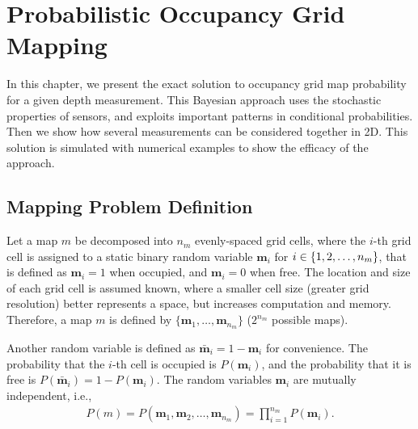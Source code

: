 
\chapter{Probabilistic Occupancy Grid Mapping} \label{chap:pogm}

In this chapter, we present the exact solution to occupancy grid map probability for a given depth measurement. This Bayesian approach uses the stochastic properties of sensors, and exploits important patterns in conditional probabilities. Then we show how several measurements can be considered together in 2D. This solution is simulated with numerical examples to show the efficacy of the approach.

\section{Mapping Problem Definition}

Let a map $m$ be decomposed into $n_m$ evenly-spaced grid cells, where the $i$-th grid cell is assigned to a static binary random variable $\mathbf{m}_i$ for $i\in\left\{ 1,2,\ldots,n_m \right\}$, that is defined as $\mathbf{m}_i=1$ when occupied, and $\mathbf{m}_i=0$ when free. The location and size of each grid cell is assumed known, where a smaller cell size (greater grid resolution) better represents a space, but increases computation and memory. Therefore, a map $m$ is defined by $\{\mathbf{m}_1,\ldots, \mathbf{m}_{n_m}\}$ ($2^{n_{m}}$ possible maps).

Another random variable is defined as $\bar{\mathbf{m}}_i=1-\mathbf{m}_i$ for convenience. The probability that the $i$-th cell is occupied is $P(\mathbf{m}_i)$, and the probability that it is free is $P(\bar{\mathbf{m}}_i)=1-P(\mathbf{m}_i)$. The random variables $\mathbf{m}_i$ are mutually independent, i.e.,
\begin{align}
P(m)=P(\mathbf{m}_1,\mathbf{m}_2,\ldots,\mathbf{m}_{n_m})=\prod_{i=1}^{n_m}P(\mathbf{m}_i).
\end{align}

